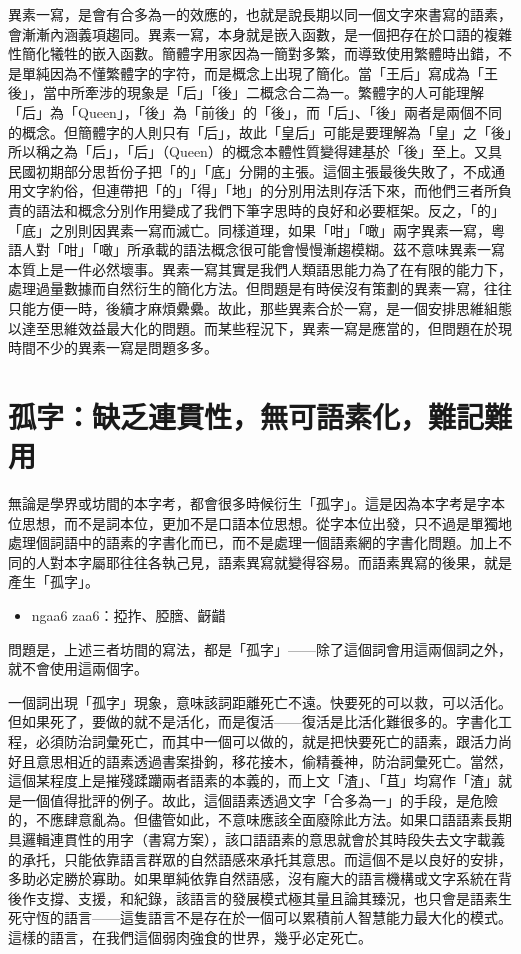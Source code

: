 \documentclass[a5paper, 12pt, openany]{book} %
\begin{document}
異素一寫，是會有合多為一的效應的，也就是說長期以同一個文字來書寫的語素，會漸漸內涵義項趨同。異素一寫，本身就是嵌入函數，是一個把存在於口語的複雜性簡化犧牲的嵌入函數。簡體字用家因為一簡對多繁，而導致使用繁體時出錯，不是單純因為不懂繁體字的字符，而是概念上出現了簡化。當「王后」寫成為「王後」，當中所牽涉的現象是「后」「後」二概念合二為一。繁體字的人可能理解「后」為「Queen」，「後」為「前後」的「後」，而「后」、「後」兩者是兩個不同的概念。但簡體字的人則只有「后」，故此「皇后」可能是要理解為「皇」之「後」所以稱之為「后」，「后」（Queen）的概念本體性質變得建基於「後」至上。又具民國初期部分思哲份子把「的」「底」分開的主張。這個主張最後失敗了，不成通用文字約俗，但連帶把「的」「得」「地」的分別用法則存活下來，而他們三者所負責的語法和概念分別作用變成了我們下筆字思時的良好和必要框架。反之，「的」「底」之別則因異素一寫而滅亡。同樣道理，如果「咁」「噉」兩字異素一寫，粵語人對「咁」「噉」所承載的語法概念很可能會慢慢漸趨模糊。茲不意味異素一寫本質上是一件必然壞事。異素一寫其實是我們人類語思能力為了在有限的能力下，處理過量數據而自然衍生的簡化方法。但問題是有時侯沒有策劃的異素一寫，往往只能方便一時，後續才麻煩纍纍。故此，那些異素合於一寫，是一個安排思維組態以達至思維效益最大化的問題。而某些程況下，異素一寫是應當的，但問題在於現時間不少的異素一寫是問題多多。

\section{孤字：缺乏連貫性，無可語素化，難記難用}

無論是學界或坊間的本字考，都會很多時候衍生「孤字」。這是因為本字考是字本位思想，而不是詞本位，更加不是口語本位思想。從字本位出發，只不過是單獨地處理個詞語中的語素的字書化而已，而不是處理一個語素網的字書化問題。加上不同的人對本字屬耶往往各執己見，語素異寫就變得容易。而語素異寫的後果，就是產生「孤字」。

\begin{itemize}
\item  ngaa6 zaa6：掗拃、𦜖膪、齖齰
\end{itemize}

問題是，上述三者坊間的寫法，都是「孤字」——除了這個詞會用這兩個詞之外，就不會使用這兩個字。

一個詞出現「孤字」現象，意味該詞距離死亡不遠。快要死的可以救，可以活化。但如果死了，要做的就不是活化，而是復活——復活是比活化難很多的。字書化工程，必須防治詞彙死亡，而其中一個可以做的，就是把快要死亡的語素，跟活力尚好且意思相近的語素透過書案掛鉤，移花接木，偷精養神，防治詞彙死亡。當然，這個某程度上是摧殘蹂躪兩者語素的本義的，而上文「渣」、「苴」均寫作「渣」就是一個值得批評的例子。故此，這個語素透過文字「合多為一」的手段，是危險的，不應肆意亂為。但儘管如此，不意味應該全面廢除此方法。如果口語語素長期具邏輯連貫性的用字（書寫方案），該口語語素的意思就會於其時段失去文字載義的承托，只能依靠語言群眾的自然語感來承托其意思。而這個不是以良好的安排，多助必定勝於寡助。如果單純依靠自然語感，沒有龐大的語言機構或文字系統在背後作支撐、支援，和紀錄，該語言的發展模式極其量且論其臻況，也只會是語素生死守恆的語言——這隻語言不是存在於一個可以累積前人智慧能力最大化的模式。這樣的語言，在我們這個弱肉強食的世界，幾乎必定死亡。
\end{document}
